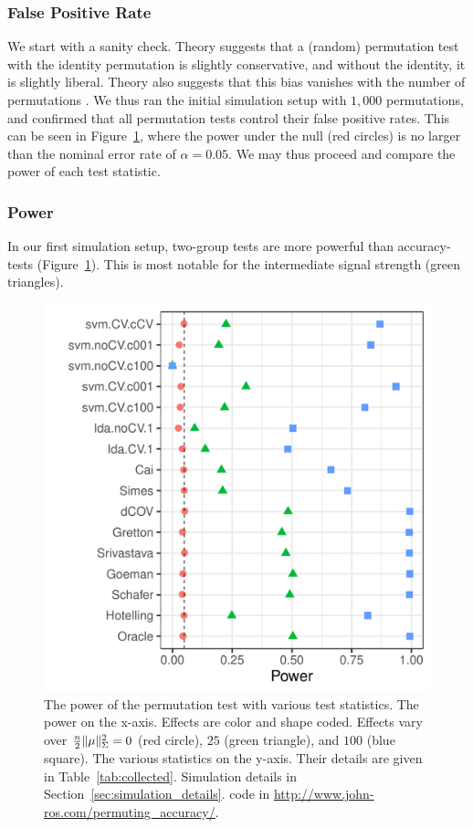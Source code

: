 \documentclass[oupdraft]{bio}
\begin{document}
\subsubsection{False Positive Rate}
\label{sec:type_i}

We start with a sanity check. 
Theory suggests that a (random) permutation test with the identity permutation is slightly conservative, and without the identity, it is slightly liberal.
Theory also suggests that this bias vanishes with the number of permutations \citep{hemerik_exact_2014}.
We thus ran the initial simulation setup with $1,000$ permutations, and confirmed that all permutation tests control their false positive rates. 
This can be seen in Figure~\ref{fig:simulation_1}, where the power under the null (red circles) is no larger than the nominal error rate of $\alpha=0.05$. 
We may thus proceed and compare the power of each test statistic. 



\subsubsection{Power}
\label{sec:power}

In our first simulation setup, two-group tests are more powerful than accuracy-tests (Figure~\ref{fig:simulation_1}). 
This is most notable for the intermediate signal strength (green triangles). 

\begin{figure}[h]
	\centering
	\includegraphics[width=0.5\columnwidth]{"file2"}
	\caption{
		The power of the permutation test with various test statistics. 
		The power on the x-axis. 
		Effects are color and shape coded. 
		Effects vary over $\frac{n}{2}\Vert \mu \Vert^2_\Sigma=0$ (red circle), $25$ (green triangle), and $100$ (blue square). 
		The various statistics on the y-axis. 
		Their details are given in Table~\ref{tab:collected}. 
		Simulation details in Section~\ref{sec:simulation_details}.
		\R code in \url{http://www.john-ros.com/permuting_accuracy/}.}	
	\label{fig:simulation_1}
\end{figure}
\end{document}
